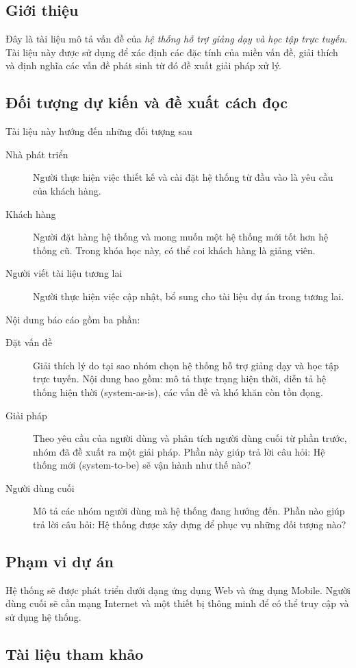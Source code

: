 \documentclass[./../main_file.tex]{subfiles}
\begin{document}
	\subsection{Giới thiệu}
	Đây là tài liệu mô tả vấn đề của \textit{hệ thống hỗ trợ giảng dạy và học tập trực tuyến}.
	Tài liệu này được sử dụng để xác định các đặc tính của miền vấn đề, giải thích và định nghĩa các vấn đề phát sinh từ đó đề xuất giải pháp xử lý.
	
	\subsection{Đối tượng dự kiến và đề xuất cách đọc}
	Tài liệu này hướng đến những đối tượng sau
	\begin{description}
		\item [Nhà phát triển] Người thực hiện việc thiết kế và cài đặt hệ thống từ đầu vào là yêu cầu của khách hàng.
		\item [Khách hàng] Người đặt hàng hệ thống và mong muốn một hệ thống mới tốt hơn hệ thống cũ. Trong khóa học này, có thể coi khách hàng là giảng viên.
		\item [Người viết tài liệu tương lai] Người thực hiện việc cập nhật, bổ sung cho tài liệu dự án trong tương lai.
		
	\end{description}
	Nội dung báo cáo gồm ba phần:
	\begin{description}
		\item [Đặt vấn đề] Giải thích lý do tại sao nhóm chọn hệ thống hỗ trợ giảng dạy và học tập trực tuyến. Nội dung bao gồm: mô tả thực trạng hiện thời, diễn tả hệ thống hiện thời (system-as-is), các vấn đề và khó khăn còn tồn đọng.
		\item [Giải pháp] Theo yêu cầu của người dùng và phân tích người dùng cuối từ phần trước, nhóm đã đề xuất ra một giải pháp. Phần này giúp trả lời câu hỏi: Hệ thống mới (system-to-be) sẽ vận hành như thế nào?
		\item [Người dùng cuối] Mô tả các nhóm người dùng mà hệ thống đang hướng đến. Phần nào giúp trả lời câu hỏi: Hệ thống được xây dựng để phục vụ những đối tượng nào?
	\end{description}

	\subsection{Phạm vi dự án}
	Hệ thống sẽ được phát triển dưới dạng ứng dụng Web và ứng dụng Mobile. Người dùng cuối sẽ cần mạng Internet và một thiết bị thông minh để có thể truy cập và sử dụng hệ thống.

	
	\subsection{Tài liệu tham khảo}
	\nocite{*}
	\printbibliography[heading=none]
	
	\clearpage
	
\end{document}
